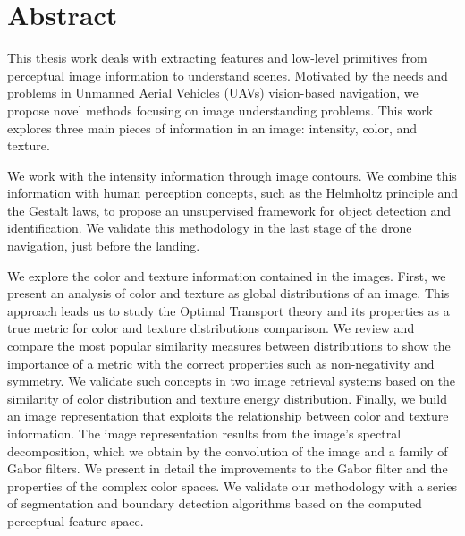 \chapter*{Abstract}

\vspace*{-8ex}
\noindent This thesis work deals with extracting features and low-level primitives from perceptual image information to understand scenes. Motivated by the needs and problems in Unmanned Aerial Vehicles (UAVs) vision-based navigation, we propose novel methods focusing on image understanding problems. This work explores three main pieces of information in an image: intensity, color, and texture.
\newline 

\noindent We work with the intensity information through image contours. We combine this information with human perception concepts, such as the Helmholtz principle and the Gestalt laws, to propose an unsupervised framework for object detection and identification. We validate this methodology in the last stage of the drone navigation, just before the landing. 
\newline

\noindent We explore the color and texture information contained in the images. First, we present an analysis of color and texture as global distributions of an image. This approach leads us to study the Optimal Transport theory and its properties as a true metric for color and texture distributions comparison. We review and compare the most popular similarity measures between distributions to show the importance of a metric with the correct properties such as non-negativity and symmetry. We validate such concepts in two image retrieval systems based on the similarity of color distribution and texture energy distribution. 
\noindent Finally, we build an image representation that exploits the relationship between color and texture information. The image representation results from the image's spectral decomposition, which we obtain by the convolution of the image and a family of Gabor filters. We present in detail the improvements to the Gabor filter and the properties of the complex color spaces. We validate our methodology with a series of segmentation and boundary detection algorithms based on the computed perceptual feature space.

